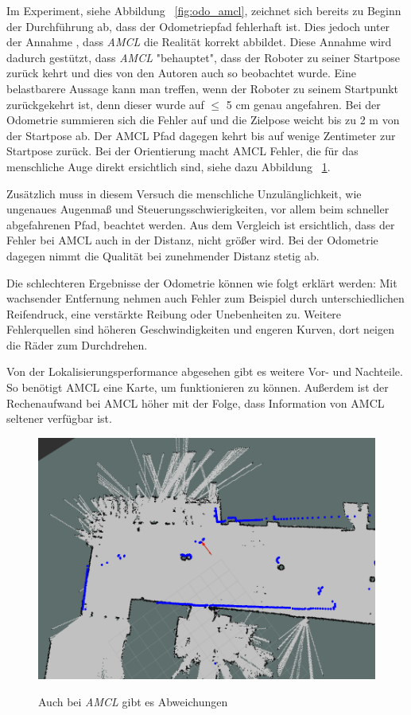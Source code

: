 \documentclass[11pt,a4paper]{article}
\begin{document}
{	Im Experiment, siehe Abbildung ~\ref{fig:odo_amcl}, zeichnet sich bereits zu Beginn der Durchf\"uhrung ab, dass der Odometriepfad fehlerhaft ist. Dies jedoch unter der Annahme , dass \textit{AMCL} die Realit\"at korrekt abbildet. Diese Annahme wird dadurch gest\"utzt, dass \textit{AMCL} "behauptet", dass der Roboter zu seiner Startpose zur\"uck kehrt und dies von den Autoren auch so beobachtet wurde.  
	Eine belastbarere Aussage kann man treffen, wenn der Roboter zu seinem Startpunkt zur\"uckgekehrt ist, denn dieser wurde auf $\leq$ 5 cm genau angefahren. Bei der Odometrie summieren sich die Fehler auf und die Zielpose weicht bis zu 2 m von der Startpose ab. 
	Der AMCL Pfad dagegen kehrt bis auf wenige Zentimeter zur Startpose zur\"uck. Bei der Orientierung macht AMCL Fehler, die f\"ur das menschliche Auge direkt ersichtlich sind, siehe dazu Abbildung ~\ref{fig:amclFails}.

	 Zus\"atzlich muss in diesem Versuch die menschliche Unzul\"anglichkeit, wie ungenaues Augenma{\ss} und Steuerungsschwierigkeiten, vor allem beim schneller abgefahrenen Pfad, beachtet werden. Aus dem Vergleich ist ersichtlich, dass der Fehler bei AMCL auch in der Distanz, nicht gr\"o{\ss}er wird.
	 Bei der Odometrie dagegen nimmt die Qualit\"at bei zunehmender Distanz stetig ab. 

	Die schlechteren Ergebnisse der Odometrie k\"onnen wie folgt erkl\"art werden: Mit wachsender Entfernung nehmen auch Fehler zum Beispiel durch unterschiedlichen Reifendruck, eine verst\"arkte Reibung oder Unebenheiten zu. Weitere Fehlerquellen sind h\"oheren Geschwindigkeiten und engeren Kurven, dort neigen die R\"ader zum Durchdrehen. 	



	Von der Lokalisierungsperformance abgesehen gibt es weitere Vor- und Nachteile. So ben\"otigt AMCL eine Karte, um funktionieren zu k\"onnen. Au{\ss}erdem ist der Rechenaufwand bei AMCL h\"oher mit der Folge, dass Information von AMCL seltener verf\"ugbar ist. 


\begin{figure}[h]
	\centering
	{\includegraphics[width=\linewidth]{pictures/amcl_fail.png}}
	\caption{ Auch bei \textit{AMCL} gibt es Abweichungen \label{fig:amclFails}}
\end{figure}





}
\end{document}
